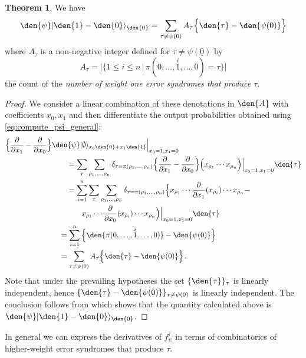 \documentclass[english,letter paper,12pt,reqno]{article}
\DeclarePairedDelimiter\ket{\lvert}{\rangle}
\theoremstyle{definition}
\newtheorem{theorem}{Theorem}[section]
\def\vacu{\ket{\emptyset}}
\def\be{\begin{equation}}
\def\ee{\end{equation}}
\def\l{\,|\,}
\begin{document}
\begin{theorem}\label{theorem:error_count} We have
\be
\den{\psi} \ket{ \den{1} - \den{0} }_{\den{0}} = \sum_{\tau \neq \psi(0)} A_\tau \Big\{ \den{\tau} - \den{\psi(0)} \Big\}
\ee
where $A_\tau$ is a non-negative integer defined for $\tau \neq \psi(\underline{0})$ by
\[
A_\tau = \Big| \big\{ 1 \le i \le n \l \pi(0, \ldots, \overset{i}{1}, \ldots, 0) = \tau \big\} \Big|
\]
the count of the \emph{number of weight one error syndromes that produce $\tau$}.
\end{theorem}
\begin{proof}
    We consider a linear combination of these denotations in $\den{A}$ with coefficients $x_0,x_1$ and then differentiate the output probabilities obtained using \eqref{eq:compute_psi_general}:
\begin{align*}
    \Big\{ \frac{\partial}{\partial x_1} - \frac{\partial}{\partial x_0} \Big\} & \den{\psi} \vacu_{x_0 \den{0} + x_1 \den{1}}\Bigr|_{x_0=1,x_1=0}\\
    &\qquad = \sum_\tau \sum_{\rho_1,\ldots,\rho_n} \delta_{\tau = \pi(\rho_1,\ldots,\rho_n)} \Big\{ \frac{\partial}{\partial x_1} - \frac{\partial}{\partial x_0} \Big\}\Big( x_{\rho_1} \cdots x_{\rho_n} \Big) \Bigr|_{x_0=1,x_1=0} \den{\tau}\\
    &\qquad = \sum_{i=1}^n \sum_\tau \sum_{\rho_1,\ldots,\rho_n} \delta_{\tau = \pi(\rho_1,\ldots,\rho_n)} \Big\{ x_{\rho_1} \cdots \frac{\partial}{\partial x_1}( x_{\rho_i} ) \cdots x_{\rho_n} - \\
    &\qquad\qquad x_{\rho_1} \cdots \frac{\partial}{\partial x_0}( x_{\rho_i} ) \cdots x_{\rho_n} \Big) \Bigr|_{x_0=1,x_1=0} \den{\tau}\\
    &\quad = \sum_{i=1}^n \Big\{ \den{\pi(0,\ldots,\overset{i}{1},\ldots,0)} - \den{\psi(0)} \Big\}\\
    &\quad = \sum_{\tau \neq \psi(0)} A_\tau \Big\{ \den{\tau} - \den{\psi(0)} \Big\}\,.
\end{align*}
Note that under the prevailing hypotheses the set $\{ \den{\tau} \}_\tau$ is linearly independent, hence $\{ \den{\tau} - \den{\psi(0)} \}_{\tau \neq \psi(0)}$ is linearly independent. The conclusion follows from \cite[Corollary 4.5]{clift2018derivatives} which shows that the quantity calculated above is $\den{\psi} \ket{ \den{1} - \den{0} }_{\den{0}}$.
\end{proof}

In general we can express the derivatives of $f^\tau_\psi$ in terms of combinatorics of higher-weight error syndromes that produce $\tau$.
\end{document}
